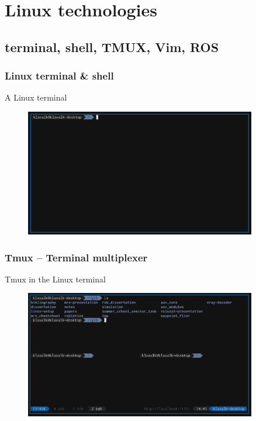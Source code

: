 \documentclass[aspectratio=1610]{beamer}
\begin{document}


\section{Linux technologies}
\subsection{terminal, shell, TMUX, Vim, ROS}


\begin{frame}
  \frametitle{Linux terminal \& shell}

  \begin{block}{A Linux terminal}
    \begin{figure}
      \includegraphics[width=0.9\textwidth]{./fig/terminal.png}
    \end{figure}
  \end{block}

\end{frame}



\begin{frame}

  \frametitle{Tmux -- Terminal multiplexer}

  \begin{block}{Tmux in the Linux terminal}
    \begin{figure}
      \includegraphics[width=0.9\textwidth]{./fig/tmux.png}
    \end{figure}
  \end{block}

\end{frame}
\end{document}

